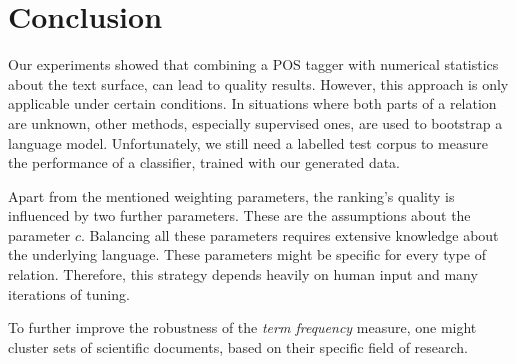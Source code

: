 \documentclass[runningheads]{llncs}
\begin{document}
\section{Conclusion}
Our experiments showed that combining a POS tagger with numerical statistics about the text surface, can lead to quality results. However, this approach is only applicable under certain conditions. In situations where both parts of a relation are unknown, other methods, especially supervised ones, are used to bootstrap a language model. Unfortunately, we still need a labelled test corpus to measure the performance of a classifier, trained with our generated data.


Apart from the mentioned weighting parameters, the ranking's quality is influenced by two further parameters. These are the assumptions about the parameter $c$. Balancing all these parameters requires extensive knowledge about the underlying language. These parameters might be specific for every type of relation. Therefore, this strategy depends heavily on human input and many iterations of tuning.

To further improve the robustness of the \emph{term frequency} measure, one might cluster sets of scientific documents, based on their specific field of research.







\end{document}
